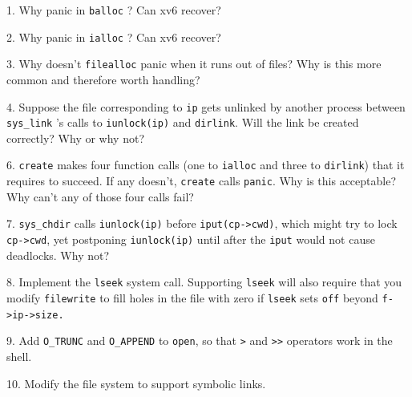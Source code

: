 1. Why panic in
\lstinline{balloc} ?
Can xv6 recover?

2. Why panic in
\lstinline{ialloc} ?
Can xv6 recover?

3. Why doesn't
\lstinline{filealloc}
panic when it runs out of files?
Why is this more common and therefore worth handling?

4. Suppose the file corresponding to 
\lstinline{ip}
gets unlinked by another process
between 
\lstinline{sys_link} 's
calls to 
\lstinline{iunlock(ip)}
and
\lstinline{dirlink}.
Will the link be created correctly?
Why or why not?

6.
\lstinline{create}
makes four function calls (one to
\lstinline{ialloc}
and three to
\lstinline{dirlink})
that it requires to succeed.
If any doesn't,
\lstinline{create}
calls
\lstinline{panic}.
Why is this acceptable?
Why can't any of those four calls fail?

7. 
\lstinline{sys_chdir}
calls
\lstinline{iunlock(ip)}
before
\lstinline{iput(cp->cwd)},
which might try to lock
\lstinline{cp->cwd},
yet postponing
\lstinline{iunlock(ip)}
until after the
\lstinline{iput}
would not cause deadlocks.
Why not?

8. Implement the
\lstinline{lseek}
system call.  Supporting
\lstinline{lseek}
will also require that you modify
\lstinline{filewrite}
to fill holes in the file with zero if
\lstinline{lseek}
sets
\lstinline{off}
beyond
\lstinline{f->ip->size.}

9. Add
\lstinline{O_TRUNC}
and
\lstinline{O_APPEND}
to
\lstinline{open},
so that
\lstinline{>}
and
\lstinline{>>}
operators work in the shell.

10. Modify the file system to support symbolic links.
